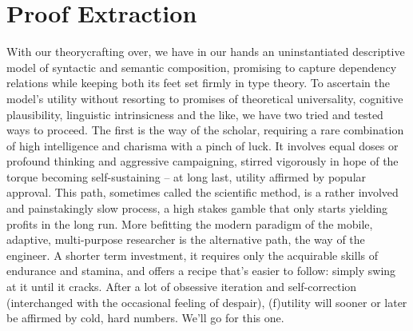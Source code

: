 \chapter{Proof Extraction}
\label{chapter:chapter_3}


With our theorycrafting over, we have in our hands an uninstantiated descriptive model of syntactic and semantic composition, promising to capture dependency relations while keeping both its feet set firmly in type theory.
To ascertain the model's utility without resorting to promises of theoretical universality, cognitive plausibility, linguistic intrinsicness and the like, we have two tried and tested ways to proceed.
The first is the way of the scholar, requiring a rare combination of high intelligence and charisma with a pinch of luck.
It involves equal doses or profound thinking and aggressive campaigning, stirred vigorously in hope of the torque becoming self-sustaining --  at long last, utility affirmed by popular approval.
This path, sometimes called the scientific method, is a rather involved and painstakingly slow process, a high stakes gamble that only starts yielding profits in the long run.
More befitting the modern paradigm of the mobile, adaptive, multi-purpose researcher is the alternative path, the way of the engineer.
A shorter term investment, it requires only the acquirable skills of endurance and stamina, and offers a recipe that's easier to follow: simply swing at it until it cracks.
After a lot of obsessive iteration and self-correction (interchanged with the occasional feeling of despair), (f)utility will sooner or later be affirmed by cold, hard numbers.
We'll go for this one.

